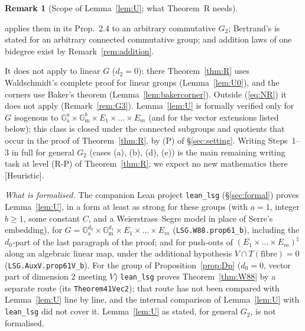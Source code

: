 \documentclass[11pt]{amsart}
\theoremstyle{definition}
\newtheorem{remark}[theorem]{Remark}
\newcommand{\Ga}{\mathbb{G}_{\mathrm a}}
\newcommand{\Gm}{\mathbb{G}_{\mathrm m}}
\newcommand{\lab}[1]{\textup{[#1]}}
\begin{document}
\begin{remark}[Scope of Lemma~\ref{lem:U}; what Theorem~R needs]
\begin{itemize}
applies them in its Prop.~2.4 to an arbitrary commutative $G_2$; Bertrand's \cite[App.~I, Lemme~7]{W79} is stated for an
arbitrary connected commutative group; and addition laws of one bidegree exist by Remark~\ref{rem:addition}.
\end{itemize}
It does not apply to linear $G$ ($d_2=0$): there Theorem~\ref{thm:R} uses Waldschmidt's complete proof for linear groups
(Lemma~\ref{lem:U0}), and the corners use Baker's theorem (Lemma~\ref{lem:bakercorner}). Outside (\ref{eq:NR}) it does not
apply (Remark~\ref{rem:G3}). Lemma~\ref{lem:U} is formally verified only for $G$ isogenous to
$\Ga^a\times\Gm^b\times E_1\times\dots\times E_m$ (and for the vector extensions listed below); this class is closed under
the connected subgroups and quotients that occur in the proof of Theorem~\ref{thm:R}, by (P) of \S\ref{sec:setting}.
Writing Steps~1--3 in full for general $G_2$ (cases (a), (b), (d), (e)) is the main remaining writing task at level (R-P)
of Theorem~\ref{thm:R}; we expect no new mathematics there \lab{Heuristic}.
\end{remark}

\noindent\emph{What is formalised.} The companion Lean project \texttt{lean\_lsg} (\S\ref{sec:formal}) proves
Lemma~\ref{lem:U}, in a form at least as strong for these groups (with $a=1$, integer $b\ge1$, some constant $C$, and a
Weierstrass--Segre model in place of Serre's embedding), for $G=\Ga^{d_0}\times\Gm^{d_1}\times E_1\times\dots\times E_m$
(\texttt{LSG.W88.prop61\_b}), including the $d_0$-part of the last paragraph of the proof; and for push-outs of
$(E_1\times\dots\times E_m)^\natural$ along an algebraic linear map, under the additional hypothesis
$V\cap T(\text{fibre})=0$ (\texttt{LSG.AuxV.prop61V\_b}). For the group of Proposition~\ref{prop:Dp} ($d_0=0$, vector part of
dimension $2$ meeting $V$) \texttt{lean\_lsg} proves Theorem~\ref{thm:W88} by a separate route (its \texttt{Theorem41Vec2});
that route has not been compared with Lemma~\ref{lem:U} line by line, and the internal comparison of Lemma~\ref{lem:U} with
\texttt{lean\_lsg} did not cover it. Lemma~\ref{lem:U} as stated, for general $G_2$, is not
formalised.
\end{document}

